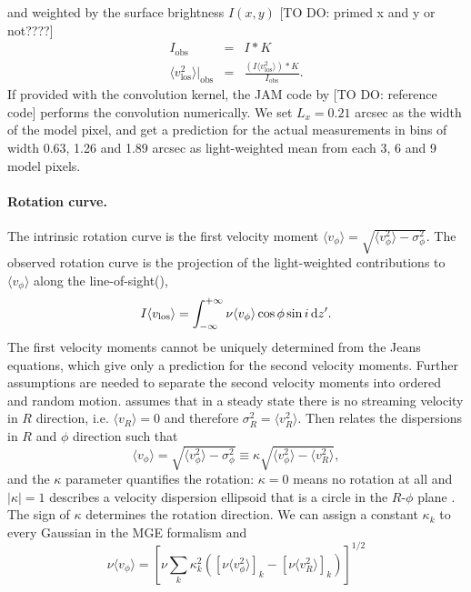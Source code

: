 and weighted by the surface brightness $I(x,y)$ [TO DO: primed x and y or not????]
\begin{eqnarray*}
I_\text{obs} &=& I \ast K\\
\langle v_\text{los}^2 \rangle |_\text{obs} &=& \frac{(I \langle v_\text{los}^2\rangle) \ast K}{I_\text{obs}}.
\end{eqnarray*}
If provided with the convolution kernel, the JAM code by \citet{Cap08} [TO DO: reference code] performs the convolution numerically. We set $L_x = 0.21$ arcsec as the width of the model pixel, and get a prediction for the actual measurements in bins of width 0.63, 1.26 and 1.89 arcsec \citep{SWELLSV} as light-weighted mean from each 3, 6 and 9 model pixels.

\paragraph{Rotation curve.} The intrinsic rotation curve is the first velocity moment $\langle v_\phi\rangle = \sqrt{\langle v_\phi^2 \rangle - \sigma_\phi^2}$. The observed rotation curve is the projection of the light-weighted contributions to $\langle v_\phi\rangle$ along the line-of-sight(\cite{Cap08}),
\begin{equation*}
I \langle v_\text{los}\rangle = \int_{-\infty}^{+\infty} \nu \langle v_\phi\rangle \cos \phi \sin i \mathop{}\!\mathrm{d} z'.
\end{equation*}
The first velocity moments cannot be uniquely determined from the Jeans equations, which give only a prediction for the second velocity moments. Further assumptions are needed to separate the second velocity moments into ordered and random motion. \citet{Cap08} assumes that in a steady state there is no streaming velocity in $R$ direction, i.e. $\langle v_R \rangle = 0$ and therefore $\sigma_R^2 = \langle v_R^2 \rangle$. Then \citet{Cap08} relates the dispersions in $R$ and $\phi$ direction such that
$$\langle v_\phi\rangle = \sqrt{\langle v_\phi^2 \rangle - \sigma_\phi^2} \equiv \kappa \sqrt{\langle v_\phi^2 \rangle - \langle v_R^2 \rangle},$$
and the $\kappa$ parameter quantifies the rotation: $\kappa = 0$ means no rotation at all and $|\kappa| = 1$ describes a velocity dispersion ellipsoid that is a circle in the $R$-$\phi$ plane \citep{Cap08}. The sign of $\kappa$ determines the rotation direction. We can assign a constant $\kappa_k$ to every Gaussian in the MGE formalism and
\begin{equation*}
\nu \langle v_\phi\rangle = \left[\nu \sum_{k} \kappa_k^2 \left( [\nu\langle v_\phi^2 \rangle]_k - [\nu\langle v_R^2 \rangle]_k\right) \right]^{1/2}
\end{equation*} 
